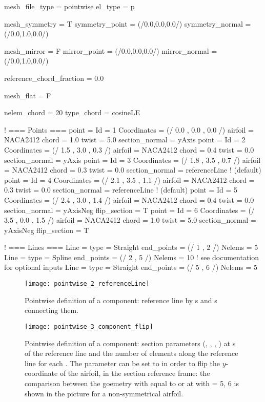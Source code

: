 \begin{inputfile}[frame=single, caption={''Pointwise'' geometry definition }, label={file:pointwise_example_file.in}]
mesh_file_type = pointwise
el_type = p

mesh_symmetry = T
symmetry_point = (/0.0,0.0,0.0/)
symmetry_normal = (/0.0,1.0,0.0/)

mesh_mirror = F
mirror_point = (/0.0,0.0,0.0/)
mirror_normal = (/0.0,1.0,0.0/)

reference_chord_fraction = 0.0

mesh_flat = F

nelem_chord = 20
type_chord = cosineLE

! === Points ===
point = {
  Id = 1
  Coordinates = (/ 0.0 , 0.0 , 0.0 /)
  airfoil = NACA2412
  chord = 1.0
  twist = 5.0
  section_normal = yAxis
}
point = {
  Id = 2
  Coordinates = (/ 1.5 , 3.0 , 0.3 /)
  airfoil = NACA2412
  chord = 0.4
  twist = 0.0
  section_normal = yAxis
}
point = {
  Id = 3
  Coordinates = (/ 1.8 , 3.5 , 0.7 /)
  airfoil = NACA2412
  chord = 0.3
  twist = 0.0
  section_normal = referenceLine ! (default)
}
point = {
  Id = 4
  Coordinates = (/ 2.1 , 3.5 , 1.1 /)
  airfoil = NACA2412
  chord = 0.3
  twist = 0.0
  section_normal = referenceLine ! (default)
}
point = {
  Id = 5
  Coordinates = (/ 2.4 , 3.0 , 1.4 /)
  airfoil = NACA2412
  chord = 0.4
  twist = 0.0
  section_normal = yAxisNeg
  flip_section = T
}
point = {
  Id = 6
  Coordinates = (/ 3.5 , 0.0 , 1.5 /)
  airfoil = NACA2412
  chord = 1.0
  twist = 5.0
  section_normal = yAxisNeg
  flip_section = T
}

! === Lines ===
Line = {
  type = Straight
  end_points = (/ 1 , 2 /)
  Nelems = 5
}
Line = {
  type = Spline
  end_points = (/ 2 , 5 /)
  Nelems = 10
  ! see documentation for optional inputs
}
Line = {
  type = Straight
  end_points = (/ 5 , 6 /)
  Nelems = 5
}

\end{inputfile}
%
\begin{figure}[h!]
\centering
\texttt{[image: pointwise\_2\_referenceLine]}
    \caption{Pointwise definition of a component: reference line by s and s connecting them.}
\label{fig:pointwise_reference_line}
\end{figure}
%
\begin{figure}[h!]
\centering
\texttt{[image: pointwise\_3\_component\_flip]}
    \caption{Pointwise definition of a component: section parameters (, , , ) at s of the reference line and the number  of elements along the reference line for each . The parameter  can be set to  in order to flip the $y$-coordinate of the airfoil, in the section reference frame: the comparison between the goemetry with  equal to  or   at  with  = 5, 6 is shown in the picture for a non-symmetrical airfoil.}
\label{fig:pointwise_component}
\end{figure}



